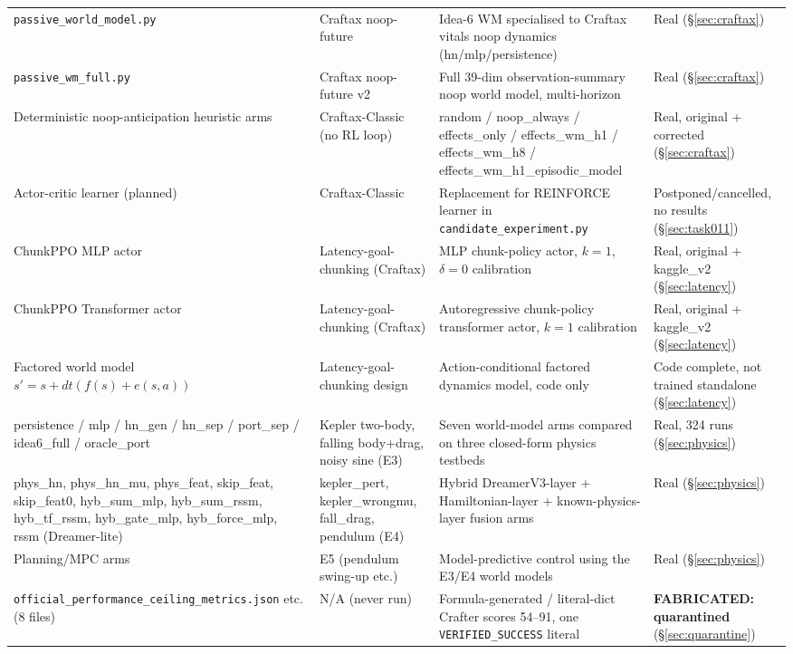\documentclass[11pt]{article}
\newcommand{\fabricated}[1]{\textcolor{red!60!black}{\textbf{FABRICATED: #1}}}
\begin{document}
\begin{longtable}{@{}p{3.4cm}p{3.0cm}p{5.7cm}p{2.6cm}@{}}
\texttt{passive\_world\_model.py} & Craftax noop-future & Idea-6 WM specialised to Craftax vitals noop dynamics (hn/mlp/persistence) & Real (\S\ref{sec:craftax}) \\
\texttt{passive\_wm\_full.py} & Craftax noop-future v2 & Full 39-dim observation-summary noop world model, multi-horizon & Real (\S\ref{sec:craftax}) \\
Deterministic noop-anticipation heuristic arms & Craftax-Classic (no RL loop) & random / noop\_always / effects\_only / effects\_wm\_h1 / effects\_wm\_h8 / effects\_wm\_h1\_episodic\_model & Real, original + corrected (\S\ref{sec:craftax}) \\
Actor-critic learner (planned) & Craftax-Classic & Replacement for REINFORCE learner in \texttt{candidate\_experiment.py} & Postponed/cancelled, no results (\S\ref{sec:task011}) \\
ChunkPPO MLP actor & Latency-goal-chunking (Craftax) & MLP chunk-policy actor, $k=1$, $\delta=0$ calibration & Real, original + kaggle\_v2 (\S\ref{sec:latency}) \\
ChunkPPO Transformer actor & Latency-goal-chunking (Craftax) & Autoregressive chunk-policy transformer actor, $k=1$ calibration & Real, original + kaggle\_v2 (\S\ref{sec:latency}) \\
Factored world model $s'=s+dt(f(s)+e(s,a))$ & Latency-goal-chunking design & Action-conditional factored dynamics model, code only & Code complete, not trained standalone (\S\ref{sec:latency}) \\
persistence / mlp / hn\_gen / hn\_sep / port\_sep / idea6\_full / oracle\_port & Kepler two-body, falling body+drag, noisy sine (E3) & Seven world-model arms compared on three closed-form physics testbeds & Real, 324 runs (\S\ref{sec:physics}) \\
phys\_hn, phys\_hn\_mu, phys\_feat, skip\_feat, skip\_feat0, hyb\_sum\_mlp, hyb\_sum\_rssm, hyb\_tf\_rssm, hyb\_gate\_mlp, hyb\_force\_mlp, rssm (Dreamer-lite) & kepler\_pert, kepler\_wrongmu, fall\_drag, pendulum (E4) & Hybrid DreamerV3-layer + Hamiltonian-layer + known-physics-layer fusion arms & Real (\S\ref{sec:physics}) \\
Planning/MPC arms & E5 (pendulum swing-up etc.) & Model-predictive control using the E3/E4 world models & Real (\S\ref{sec:physics}) \\
\texttt{official\_performance\_ceiling\_metrics.json} etc. (8 files) & N/A (never run) & Formula-generated / literal-dict Crafter scores 54--91, one \texttt{VERIFIED\_SUCCESS} literal & \fabricated{quarantined} (\S\ref{sec:quarantine}) \\

\end{longtable}
\end{document}
